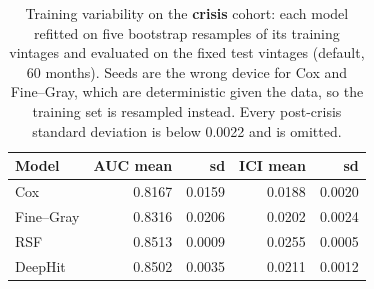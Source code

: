 \begin{table}[t]
\caption{Training variability on the \textbf{crisis} cohort: each model refitted on five bootstrap resamples of its training vintages and evaluated on the fixed test vintages (default, 60 months). Seeds are the wrong device for Cox and Fine--Gray, which are deterministic given the data, so the training set is resampled instead. Every post-crisis standard deviation is below 0.0022 and is omitted.}
\label{tab:var}
\centering\footnotesize
\begin{tabular}{@{}lrrrr@{}}
\toprule
Model & AUC mean & sd & ICI mean & sd \\
\midrule
Cox & 0.8167 & 0.0159 & 0.0188 & 0.0020 \\
Fine--Gray & 0.8316 & 0.0206 & 0.0202 & 0.0024 \\
RSF & 0.8513 & 0.0009 & 0.0255 & 0.0005 \\
DeepHit & 0.8502 & 0.0035 & 0.0211 & 0.0012 \\
\bottomrule
\end{tabular}
\end{table}
